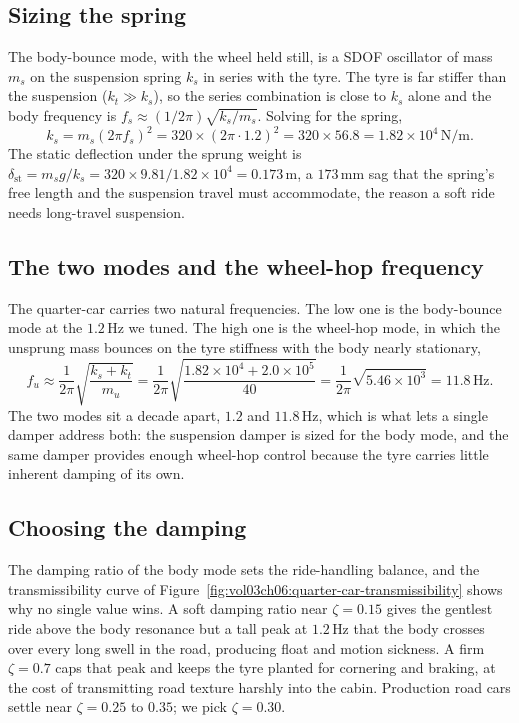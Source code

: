 \subsection{Sizing the spring}

The body-bounce mode, with the wheel held still, is a SDOF oscillator of
mass $m_s$ on the suspension spring $k_s$ in series with the tyre. The
tyre is far stiffer than the suspension ($k_t \gg k_s$), so the series
combination is close to $k_s$ alone and the body frequency is
$f_s \approx (1/2\pi)\sqrt{k_s/m_s}$. Solving for the spring,
\[
k_s = m_s(2\pi f_s)^2 = 320\times (2\pi\cdot 1.2)^2 = 320\times 56.8 =
1.82\times 10^4\,\si{\newton\per\meter}.
\]
The static deflection under the sprung weight is
$\delta_{\text{st}} = m_s g/k_s = 320\times 9.81/1.82\times 10^4 =
0.173\,\si{\meter}$, a $173\,\si{\milli\meter}$ sag that the spring's
free length and the suspension travel must accommodate, the reason a
soft ride needs long-travel suspension.

\subsection{The two modes and the wheel-hop frequency}

The quarter-car carries two natural frequencies. The low one is the
body-bounce mode at the $1.2\,\si{\hertz}$ we tuned. The high one is the
wheel-hop mode, in which the unsprung mass bounces on the tyre stiffness
with the body nearly stationary,
\[
f_u \approx \frac{1}{2\pi}\sqrt{\frac{k_s + k_t}{m_u}} = \frac{1}{2\pi}
\sqrt{\frac{1.82\times 10^4 + 2.0\times 10^5}{40}} = \frac{1}{2\pi}
\sqrt{5.46\times 10^3} = 11.8\,\si{\hertz}.
\]
The two modes sit a decade apart, $1.2$ and $11.8\,\si{\hertz}$, which
is what lets a single damper address both: the suspension damper is
sized for the body mode, and the same damper provides enough wheel-hop
control because the tyre carries little inherent damping of its own.

\subsection{Choosing the damping}

The damping ratio of the body mode sets the ride-handling balance, and
the transmissibility curve of Figure~\ref{fig:vol03ch06:quarter-car-transmissibility}
shows why no single value wins. A soft damping ratio near
$\zeta = 0.15$ gives the gentlest ride above the body resonance but a
tall peak at $1.2\,\si{\hertz}$ that the body crosses over every long
swell in the road, producing float and motion sickness. A firm
$\zeta = 0.7$ caps that peak and keeps the tyre planted for cornering
and braking, at the cost of transmitting road texture harshly into the
cabin. Production road cars settle near $\zeta = 0.25$ to $0.35$; we
pick $\zeta = 0.30$.

